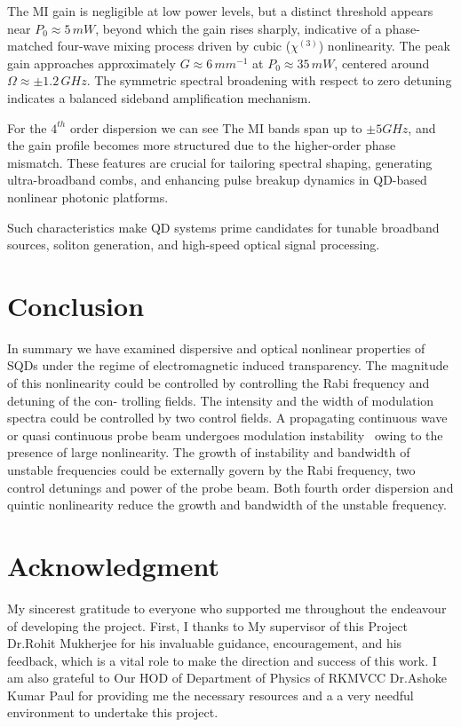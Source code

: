 \documentclass[12pt,a4paper]{article}
\begin{document}
The MI gain is negligible at low power levels, but a distinct threshold appears near \( P_0 \approx 5 \, {mW} \), beyond which the gain rises sharply, indicative of a phase-matched four-wave mixing process driven by cubic (\( \chi^{(3)} \)) nonlinearity. The peak gain approaches approximately \( G \approx 6 \, {mm^{-1}} \) at \( P_0 \approx 35 \, {mW} \), centered around \( \Omega \approx \pm 1.2 \, {GHz} \). The symmetric spectral broadening with respect to zero detuning indicates a balanced sideband amplification mechanism.

For the \(4^{th}\) order dispersion we can see The MI bands span up to $\pm5GHz$, and the gain profile becomes more structured due to the higher-order phase mismatch. These features are crucial for tailoring spectral shaping, generating ultra-broadband combs, and enhancing pulse breakup dynamics in QD-based nonlinear photonic platforms.

Such characteristics make QD systems prime candidates for tunable broadband sources, soliton generation, and high-speed optical signal processing.

\section{Conclusion}
In summary we have examined dispersive and optical nonlinear properties of SQDs under the regime of electromagnetic induced transparency. The magnitude of this nonlinearity could be controlled by controlling the Rabi frequency and detuning of the con- trolling fields. The intensity and the width of modulation spectra could be controlled by two control fields. A propagating continuous wave or quasi continuous probe beam undergoes modulation instability~\cite{lighthall} owing to the presence of large nonlinearity. The growth of instability and bandwidth of unstable frequencies could be externally govern by the Rabi frequency, two control detunings and power of the probe beam. Both fourth order dispersion and quintic nonlinearity reduce the growth and bandwidth of the unstable frequency.

\newpage
\section*{Acknowledgment}
My sincerest gratitude to everyone who supported me throughout the endeavour of developing the project. First, I thanks to My supervisor of this Project Dr.Rohit Mukherjee for his invaluable guidance, encouragement, and his feedback, which is a vital role to make the direction and success of this work. I am also grateful to Our HOD of Department of Physics of RKMVCC Dr.Ashoke Kumar Paul for providing me the necessary resources and a a very needful environment to undertake this project.

\newpage


\end{document}
